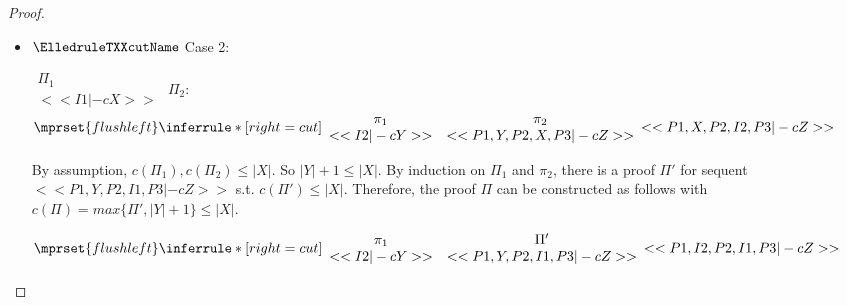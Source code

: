 \begin{proof}
\begin{enumerate}
\begin{itemize}
    \item $\ElledruleTXXcutName$ Case 2:
      \begin{center}
        \scriptsize
        \begin{math}
          \begin{array}{c}
            \Pi_1 \\
            {<<I1 |-c X>>}
          \end{array}
        \end{math}
        \qquad\qquad
        $\Pi_2$:
        \begin{math}
          $$\mprset{flushleft}
          \inferrule* [right={\tiny cut}] {
            {
              \begin{array}{cc}
                \pi_1 & \pi_2 \\
                {<<I2 |-c Y>>} & {<<P1, Y, P2, X, P3 |-c Z>>}
              \end{array}
            }
          }{<<P1, X, P2, I2, P3 |-c Z>>}
        \end{math}
      \end{center}
      By assumption, $c(\Pi_1),c(\Pi_2)\leq |X|$. So $|Y|+1 \leq |X|$. By induction on $\Pi_1$
      and $\pi_2$, there is a proof $\Pi'$ for sequent $<<P1, Y, P2, I1, P3 |-c Z>>$ s.t.
      $c(\Pi') \leq |X|$. Therefore, the proof $\Pi$ can be constructed as follows with
      $c(\Pi) = max\{\Pi', |Y|+1\} \leq |X|$.
      \begin{center}
        \scriptsize
        \begin{math}
          $$\mprset{flushleft}
          \inferrule* [right={\tiny cut}] {
            {
              \begin{array}{cc}
                \pi_1 & \Pi' \\
                {<<I2 |-c Y>>} & {<<P1, Y, P2, I1, P3 |-c Z>>}
              \end{array}
            }
          }{<<P1, I2, P2, I1, P3 |-c Z>>}
        \end{math}
      \end{center}


\end{itemize}
\end{enumerate}
\end{proof}
